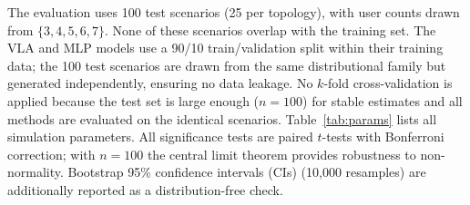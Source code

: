 \documentclass[journal]{IEEEtran}
\begin{document}
The evaluation uses 100 test scenarios (25 per topology), with user counts drawn from $\{3,4,5,6,7\}$. None of these scenarios overlap with the training set. The VLA and MLP models use a 90/10 train/validation split within their training data; the 100 test scenarios are drawn from the same distributional family but generated independently, ensuring no data leakage. No $k$-fold cross-validation is applied because the test set is large enough ($n{=}100$) for stable estimates and all methods are evaluated on the identical scenarios. Table~\ref{tab:params} lists all simulation parameters. All significance tests are paired $t$-tests with Bonferroni correction; with $n{=}100$ the central limit theorem provides robustness to non-normality. Bootstrap 95\% confidence intervals (CIs) (10{,}000 resamples) are additionally reported as a distribution-free check.
\end{document}
